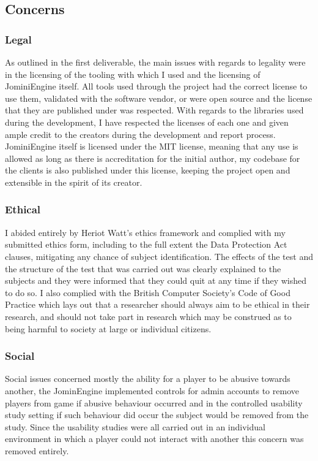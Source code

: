 \documentclass{article}
\begin{document}
\subsection{Concerns}

\subsubsection{Legal}

As outlined in the first deliverable, the main issues with regards to legality were in the licensing of the tooling with which I used and the licensing of JominiEngine itself. All tools used through the project had the correct license to use them, validated with the software vendor, or were open source and the license that they are published under was respected. With regards to the libraries used during the development, I have respected the licenses of each one and given ample credit to the creators during the development and report process. JominiEngine itself is licensed under the MIT license, meaning that any use is allowed as long as there is accreditation for the initial author, my codebase for the clients is also published under this license, keeping the project open and extensible in the spirit of its creator. 

\subsubsection{Ethical}

I abided entirely by Heriot Watt’s ethics framework and complied with my submitted ethics form, including to the full extent the Data Protection Act clauses, mitigating any chance of subject identification. The effects of the test and the structure of the test that was carried out was clearly explained to the subjects and they were informed that they could quit at any time if they wished to do so. I also complied with the British Computer Society's Code of Good Practice which lays out that a researcher should always aim to be ethical in their research, and should not take part in research which may be construed as to being harmful to society at large or individual citizens. 

\subsubsection{Social}

Social issues concerned mostly the ability for a player to be abusive towards another, the JominEngine implemented controls for admin accounts to remove players from game if abusive behaviour occurred and in the controlled usability study setting if such behaviour did occur the subject would be removed from the study. Since the usability studies were all carried out in an individual environment in which a player could not interact with another this concern was removed entirely. 
 
\end{document}
